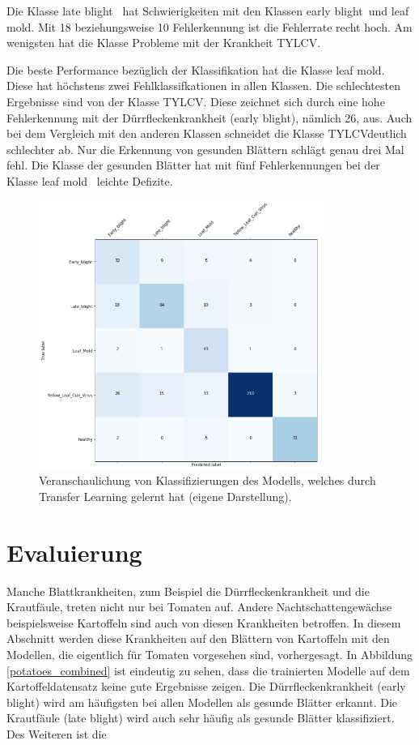 Die Klasse \glqq late blight\grqq~ hat Schwierigkeiten mit den Klassen \glqq early blight\grqq~und \glqq leaf mold\grqq. Mit 18 beziehungsweise 10 Fehlerkennung ist die Fehlerrate recht hoch. Am wenigsten hat die Klasse Probleme mit der Krankheit \glqq TYLCV\grqq.

Die beste Performance bezüglich der Klassifikation hat die Klasse \glqq leaf mold\grqq. Diese hat höchstens zwei Fehlklassifkationen in allen Klassen. Die schlechtesten Ergebnisse sind von der Klasse \glqq TYLCV\grqq. Diese zeichnet sich durch eine hohe Fehlerkennung mit der Dürrfleckenkrankheit (early blight), nämlich 26, aus.
Auch bei dem Vergleich mit den anderen Klassen schneidet die Klasse \glqq TYLCV\grqq deutlich schlechter ab. Nur die Erkennung von gesunden Blättern schlägt genau drei Mal fehl. Die Klasse der gesunden Blätter hat mit fünf Fehlerkennungen bei der Klasse \glqq leaf mold\grqq~ leichte Defizite.

\begin{figure}[h!]
	\centering
	\includegraphics[width=0.83\textwidth]{model/transfer/confusion_matrix.PNG}
	\caption{Veranschaulichung von Klassifizierungen des Modells, welches durch Transfer Learning gelernt hat (eigene Darstellung).}
	\label{transfer_confusion_matrix}
\end{figure}


\section{Evaluierung}

Manche Blattkrankheiten, zum Beispiel die Dürrfleckenkrankheit und die Krautfäule, treten nicht nur bei Tomaten auf. Andere Nachtschattengewächse beispielsweise Kartoffeln sind auch von diesen Krankheiten betroffen. In diesem Abschnitt werden diese Krankheiten auf den Blättern von Kartoffeln mit den Modellen, die eigentlich für Tomaten vorgesehen sind, vorhergesagt. In Abbildung \ref{potatoes_combined} ist eindeutig zu sehen, dass die trainierten Modelle auf dem Kartoffeldatensatz keine gute Ergebnisse zeigen. Die Dürrfleckenkrankheit (early blight) wird am häufigsten bei allen Modellen als gesunde Blätter erkannt. Die Krautfäule (late blight) wird auch sehr häufig als gesunde Blätter klassifiziert. Des Weiteren ist die 


